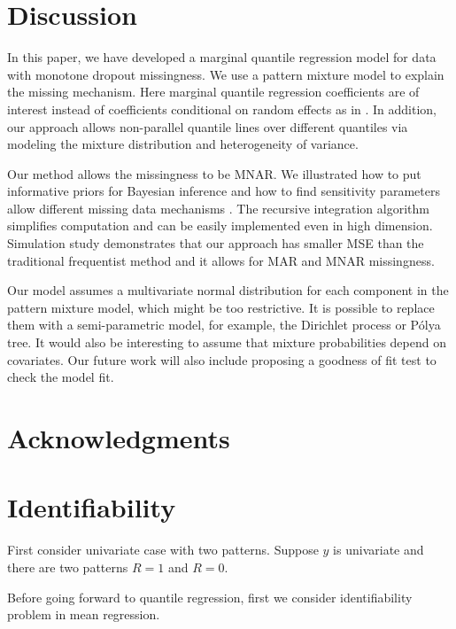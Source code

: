 \documentclass[12pt]{article}
\newcommand{\polya}{P\'{o}lya}
\begin{document}
\section{Discussion}
\label{sec:discussion}

In this paper, we have developed a marginal quantile regression model
for data with monotone dropout missingness. We use a pattern mixture
model to explain the missing mechanism. Here marginal quantile
regression coefficients are of interest instead of coefficients
conditional on random effects as in \citep{yuan2010}. In addition, our
approach allows non-parallel quantile lines over different quantiles
via modeling the mixture distribution and heterogeneity of variance.

Our method allows the missingness to be MNAR.  We illustrated how to
put informative priors for Bayesian inference and how to find
sensitivity parameters allow different missing data mechanisms .  The
recursive integration algorithm simplifies computation and can be
easily implemented even in high dimension.  Simulation study
demonstrates that our approach has smaller MSE than the traditional
frequentist method and it allows for MAR and MNAR missingness.

Our model assumes a multivariate normal distribution for each
component in the pattern mixture model, which might be too
restrictive. It is possible to replace them with a semi-parametric
model, for example, the Dirichlet process or \polya{} tree.  It would
also be interesting to assume that mixture probabilities depend on
covariates. Our future work will also include proposing a goodness of
fit test to check the model fit.

\section{Acknowledgments}



% 




\appendix
\section{Identifiability}
\label{sec:iden}
First consider univariate case with two patterns. Suppose $y$ is
univariate and there are two patterns $R = 1$ and $R = 0$.

Before going forward to quantile regression, first we consider
identifiability problem in mean regression.
\end{document}
